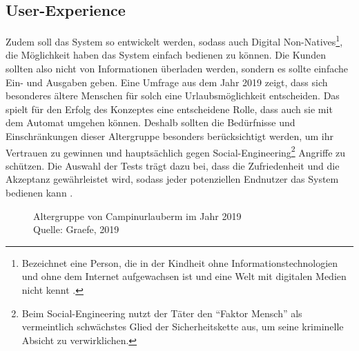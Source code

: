 \subsection{User-Experience}
Zudem soll das System so entwickelt werden, sodass auch Digital Non-Natives\footnote{Bezeichnet
eine Person, die in der Kindheit ohne Informationstechnologien und ohne dem Internet aufgewachsen ist 
und eine Welt mit digitalen Medien nicht kennt \cite{misc:MSND}.}, die Möglichkeit \cite{refart:QWDN} haben
das System einfach bedienen zu können. Die Kunden sollten also nicht von Informationen überladen werden, 
sondern es sollte einfache Ein- und Ausgaben geben. Eine Umfrage aus dem Jahr 2019 \cite{periodical:AdCJ}
zeigt, dass sich besonderes ältere Menschen \cite{periodical:AdCJ} für solch eine Urlaubsmöglichkeit entscheiden.
Das spielt für den Erfolg des Konzeptes eine entscheidene Rolle, dass auch sie mit dem Automat umgehen können. 
Deshalb sollten die Bedürfnisse und Einschränkungen dieser Altergruppe besonders berücksichtigt werden, um ihr 
Vertrauen zu gewinnen \cite{refart:HLAU} und hauptsächlich gegen Social-Engineering\footnote{Beim Social-Engineering 
nutzt der Täter den ``Faktor Mensch'' als vermeintlich schwächstes Glied der Sicherheitskette aus, um seine kriminelle
Absicht zu verwirklichen.\cite{booklet:BSSE}} Angriffe zu schützen. Die Auswahl der Tests trägt dazu bei, dass die 
Zufriedenheit und die Akzeptanz gewährleistet wird, sodass jeder potenziellen Endnutzer das System bedienen kann 
\cite{refbook:IASE}.


\vfill
\begin{figure}[H]
    \caption{Altergruppe von Campinurlauberm im Jahr 2019 \\ Quelle: Graefe, 2019}
    \label{fig:periodical_AdCJ}
\end{figure}


